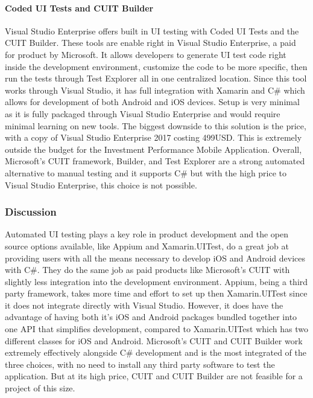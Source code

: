 \documentclass[onecolumn, draftclsnofoot,10pt, compsoc]{IEEEtran}
\begin{document}
\paragraph{Coded UI Tests and CUIT Builder}
Visual Studio Enterprise offers built in UI testing with Coded UI Tests and the CUIT Builder. These tools are enable right in Visual Studio Enterprise, a paid for product by Microsoft. It allows developers to generate UI test
code right inside the development environment, customize the code to be more specific, then run the tests through Test Explorer all in one centralized location. Since this tool works through Visual Studio, it has full
integration with Xamarin and C\# which allows for development of both Android and iOS devices. Setup is very minimal as it is fully packaged  through Visual Studio Enterprise and would require minimal learning on new tools.
The biggest downside to this solution is the price, with a copy of Visual Studio  Enterprise 2017 costing 499USD. This is extremely outside the budget for the Investment Performance Mobile Application. Overall, Microsoft's CUIT
framework, Builder, and Test Explorer are a strong automated alternative to manual testing and it supports C\# but with the high price to Visual Studio Enterprise, this choice is not possible.

\subsubsection{Discussion}
Automated UI testing plays a key role in product development and the open source options available, like Appium and Xamarin.UITest, do a great job at providing users with all the means necessary to develop iOS and Android devices
with C\#. They do the same job as paid products like Microsoft's CUIT with slightly less integration into the development environment. Appium, being a third party framework, takes more time and effort to set up then
Xamarin.UITest since it does not integrate directly with Visual Studio. However, it does have the advantage of having both it's iOS and Android packages bundled together into one API that simplifies development, compared to
Xamarin.UITest which has two different classes for iOS and Android. Microsoft's CUIT and CUIT Builder  work extremely effectively alongside C\# development and is the most integrated of the three choices, with no need
to install any third party software to test the application. But at its high price,  CUIT and CUIT Builder are not feasible for a project of this size.
\end{document}
